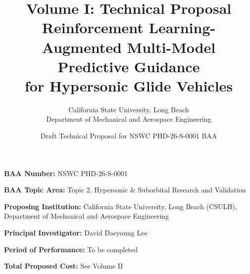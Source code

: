 \documentclass[12pt,letterpaper]{article}
\title{\textbf{Volume I: Technical Proposal}\\
Reinforcement Learning-Augmented Multi-Model Predictive Guidance\\for Hypersonic Glide Vehicles}
\author{
California State University, Long Beach\\
Department of Mechanical and Aerospace Engineering
}
\date{Draft Technical Proposal for NSWC PHD-26-S-0001 BAA}
\begin{document}
\maketitle

\noindent\textbf{BAA Number:} NSWC PHD-26-S-0001

\noindent\textbf{BAA Topic Area:} Topic 2, Hypersonic \& Suborbital Research and Validation

\noindent\textbf{Proposing Institution:} California State University, Long Beach (CSULB), Department of Mechanical and Aerospace Engineering

\noindent\textbf{Principal Investigator:} David Daeyoung Lee

\noindent\textbf{Period of Performance:} To be completed

\noindent\textbf{Total Proposed Cost:} See Volume II














\end{document}
